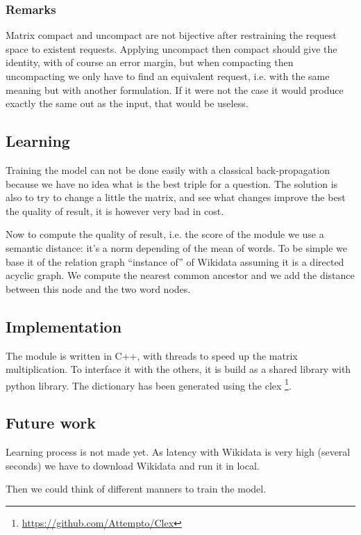\subsubsection{Remarks}

Matrix compact and uncompact are not bijective after restraining the request space to existent requests. Applying uncompact then compact should give the identity, with of course an error margin, but when compacting then uncompacting we only have to find an equivalent request, i.e. with the same meaning but with another formulation. If it were not the case it would produce exactly the same out as the input, that would be useless.

\subsection{Learning}

Training the model can not be done easily with a classical back-propagation because we have no idea what is the best triple for a question. The solution is also to try to change a little the matrix, and see what changes improve the best the quality of result, it is however very bad in cost. 

Now to compute the quality of result, i.e. the score  of the module we use a semantic distance: it's a norm depending of the mean of words. To be simple we base it of the relation graph ``instance of'' of Wikidata assuming it is a directed acyclic graph. We compute the nearest common ancestor and we add the distance between this node and the two word  nodes.

\subsection{Implementation}

The module is written in C++, with threads to speed up the matrix multiplication. To interface it with the others, it is build as a shared library with python library. The dictionary has been generated using the clex \footnote{\url{https://github.com/Attempto/Clex}}. 

\subsection{Future work}

Learning process is not made yet. As latency with Wikidata is very high (several seconds) we have to download Wikidata and run it in local.

Then we could think of different manners to train the model.


